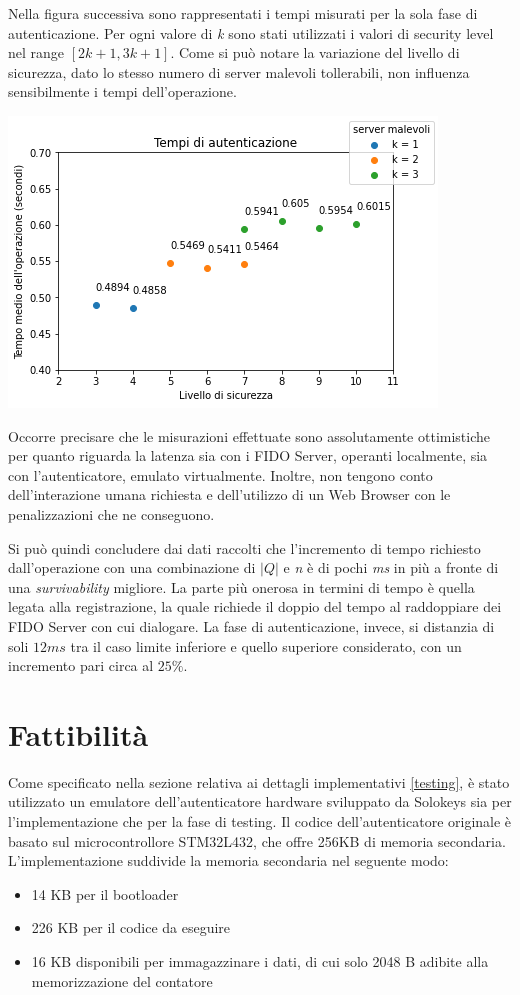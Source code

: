 Nella figura successiva sono rappresentati i tempi misurati per la sola fase di autenticazione. Per ogni valore di \emph{k} sono stati utilizzati i valori di security level nel range $[2k+1, 3k+1]$. Come si può notare la variazione del livello di sicurezza, dato lo stesso numero di server malevoli tollerabili, non influenza sensibilmente i tempi dell'operazione.
\begin{center}
	\includegraphics[scale=0.65]{figures/auth_results}
\end{center}

Occorre precisare che le misurazioni effettuate sono assolutamente ottimistiche per quanto riguarda la latenza sia con i FIDO Server, operanti localmente, sia con l'autenticatore, emulato virtualmente. Inoltre, non tengono conto dell'interazione umana richiesta e dell'utilizzo di un Web Browser con le penalizzazioni che ne conseguono. 

Si può quindi concludere dai dati raccolti che l'incremento di tempo richiesto dall'operazione con una combinazione di $|Q|$ e \emph{n} è di pochi \emph{ms} in più a fronte di una \emph{survivability} migliore. La parte più onerosa in termini di tempo è quella legata alla registrazione, la quale richiede il doppio del tempo al raddoppiare dei FIDO Server con cui dialogare. La fase di autenticazione, invece, si distanzia di soli $12 ms$ tra il caso limite inferiore e quello superiore considerato, con un incremento pari circa al $25\%$.

\section{Fattibilità}
\label{fattibilità}

Come specificato nella sezione relativa ai dettagli implementativi \ref{testing}, è stato utilizzato un emulatore dell'autenticatore hardware sviluppato da Solokeys sia per l'implementazione che per la fase di testing. Il codice dell'autenticatore originale è basato sul microcontrollore STM32L432, che offre 256KB di memoria secondaria. L'implementazione suddivide la memoria secondaria nel seguente modo:
\begin{itemize}
	\item 14 KB per il bootloader
	\item 226 KB per il codice da eseguire
	\item 16 KB disponibili per immagazzinare i dati, di cui solo 2048 B adibite alla memorizzazione del contatore
\end{itemize}

